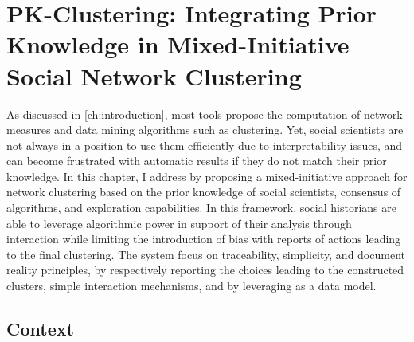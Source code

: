 \chapter{PK-Clustering: Integrating Prior Knowledge in Mixed-Initiative
Social Network Clustering}\label{ch:pk-clustering}
\minitoc

As discussed in \autoref{ch:introduction}, most \sna tools propose the computation of network measures and data mining algorithms such as clustering.
Yet, social scientists are not always in a position to use them efficiently due to interpretability issues, and can become frustrated with automatic results if they do not match their prior knowledge.
In this chapter, I address \qthree by proposing a mixed-initiative approach for network clustering based on the prior knowledge of social scientists, consensus of algorithms, and exploration capabilities.
In this framework, social historians are able to leverage algorithmic power in support of their analysis through interaction while limiting the introduction of bias with reports of actions leading to the final clustering.
The system focus on traceability, simplicity, and document reality principles, by respectively reporting the choices leading to the constructed clusters, simple interaction mechanisms, and by leveraging \modelplural as a data model.


\section{Context}

